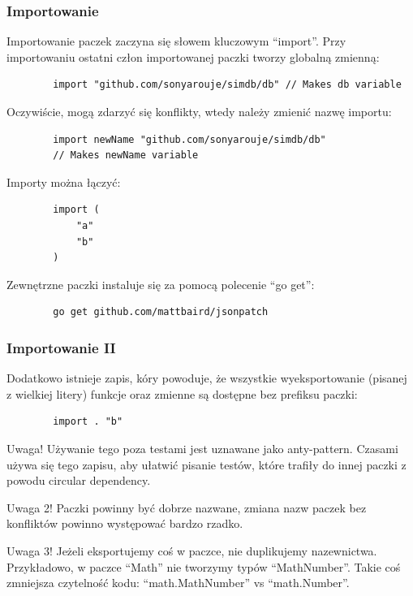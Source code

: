 \documentclass[10pt]{beamer}
\newcommand{\quotes}[1]{``#1''}
\begin{document}
\begin{frame}[fragile]
    \frametitle{Importowanie}
    Importowanie paczek zaczyna się słowem kluczowym \quotes{import}. Przy importowaniu
    ostatni człon importowanej paczki tworzy globalną zmienną:

    \begin{verbatim}
        import "github.com/sonyarouje/simdb/db" // Makes db variable
    \end{verbatim}

    Oczywiście, mogą zdarzyć się konflikty, wtedy należy zmienić nazwę importu:
    \begin{verbatim}
        import newName "github.com/sonyarouje/simdb/db" 
        // Makes newName variable
    \end{verbatim}

    Importy można łączyć:
    \begin{verbatim}
        import (
            "a"
            "b"
        )
    \end{verbatim}

    Zewnętrzne paczki instaluje się za pomocą polecenie \quotes{go get}:
    \begin{verbatim}
        go get github.com/mattbaird/jsonpatch
    \end{verbatim}
\end{frame}

\begin{frame}[fragile]
    \frametitle{Importowanie II}
    Dodatkowo istnieje zapis, kóry powoduje, że wszystkie wyeksportowanie (pisanej z wielkiej litery) funkcje oraz
    zmienne są dostępne bez prefiksu paczki:

    \begin{verbatim}
        import . "b"
    \end{verbatim}

    \begin{alertblock}{Uwaga!}
        Używanie tego poza testami jest uznawane jako anty-pattern. Czasami używa się
        tego zapisu, aby ułatwić pisanie testów, które trafiły do innej paczki z powodu
        circular dependency.       
    \end{alertblock}

    \begin{alertblock}{Uwaga 2!}
        Paczki powinny być dobrze nazwane, zmiana nazw paczek bez konfliktów powinno 
        występować bardzo rzadko.
    \end{alertblock}

    \begin{alertblock}{Uwaga 3!}
        Jeżeli eksportujemy coś w paczce, nie duplikujemy nazewnictwa. Przykładowo, w
        paczce \quotes{Math} nie tworzymy typów \quotes{MathNumber}. Takie coś zmniejsza
        czytelność kodu: \quotes{math.MathNumber} vs \quotes{math.Number}.
    \end{alertblock}
\end{frame}
\end{document}
